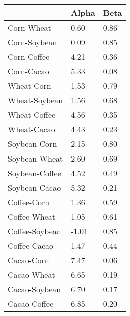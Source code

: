 \begin{tabular}{lll}
\toprule
 & Alpha & Beta \\
\midrule
Corn-Wheat & 0.60 & 0.86 \\
Corn-Soybean & 0.09 & 0.85 \\
Corn-Coffee & 4.21 & 0.36 \\
Corn-Cacao & 5.33 & 0.08 \\
Wheat-Corn & 1.53 & 0.79 \\
Wheat-Soybean & 1.56 & 0.68 \\
Wheat-Coffee & 4.56 & 0.35 \\
Wheat-Cacao & 4.43 & 0.23 \\
Soybean-Corn & 2.15 & 0.80 \\
Soybean-Wheat & 2.60 & 0.69 \\
Soybean-Coffee & 4.52 & 0.49 \\
Soybean-Cacao & 5.32 & 0.21 \\
Coffee-Corn & 1.36 & 0.59 \\
Coffee-Wheat & 1.05 & 0.61 \\
Coffee-Soybean & -1.01 & 0.85 \\
Coffee-Cacao & 1.47 & 0.44 \\
Cacao-Corn & 7.47 & 0.06 \\
Cacao-Wheat & 6.65 & 0.19 \\
Cacao-Soybean & 6.70 & 0.17 \\
Cacao-Coffee & 6.85 & 0.20 \\
\bottomrule
\end{tabular}
